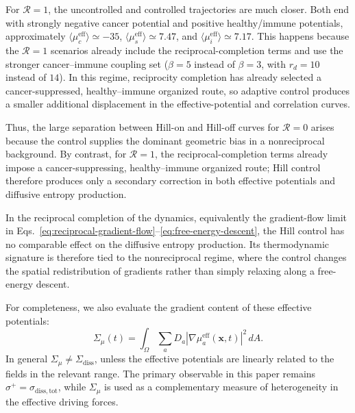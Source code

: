 For $\mathcal{R}=1$, the uncontrolled and controlled trajectories are much closer. Both end with strongly negative cancer potential and positive healthy/immune potentials, approximately $\langle\mu_c^{\mathrm{eff}}\rangle\simeq -35$, $\langle\mu_s^{\mathrm{eff}}\rangle\simeq 7.47$, and $\langle\mu_i^{\mathrm{eff}}\rangle\simeq 7.17$. This happens because the $\mathcal{R}=1$ scenarios already include the reciprocal-completion terms and use the stronger cancer--immune coupling set ($\beta=5$ instead of $\beta=3$, with $r_d=10$ instead of $14$). In this regime, reciprocity completion has already selected a cancer-suppressed, healthy--immune organized route, so adaptive control produces a smaller additional displacement in the effective-potential and correlation curves.

Thus, the large separation between Hill-on and Hill-off curves for $\mathcal{R}=0$ arises because the control supplies the dominant geometric bias in a nonreciprocal background. By contrast, for $\mathcal{R}=1$, the reciprocal-completion terms already impose a cancer-suppressing, healthy--immune organized route; Hill control therefore produces only a secondary correction in both effective potentials and diffusive entropy production.

In the reciprocal completion of the dynamics, equivalently the gradient-flow limit in Eqs.~\eqref{eq:reciprocal-gradient-flow}--\eqref{eq:free-energy-descent}, the Hill control has no comparable effect on the diffusive entropy production. Its thermodynamic signature is therefore tied to the nonreciprocal regime, where the control changes the spatial redistribution of gradients rather than simply relaxing along a free-energy descent.

For completeness, we also evaluate the gradient content of these effective potentials:
\begin{equation}
    \Sigma_{\mu}(t)=
    \int_{\Omega}\sum_a D_a
    \left|\nabla \mu_a^{\mathrm{eff}}(\mathbf{x},t)\right|^2\,dA .
    \label{eq:sigma-mu}
\end{equation}
In general $\Sigma_\mu\neq\Sigma_{\mathrm{diss}}$, unless the effective potentials are linearly related to the fields in the relevant range. The primary observable in this paper remains $\sigma^+=\sigma_{\mathrm{diss,tot}}$, while $\Sigma_\mu$ is used as a complementary measure of heterogeneity in the effective driving forces.

